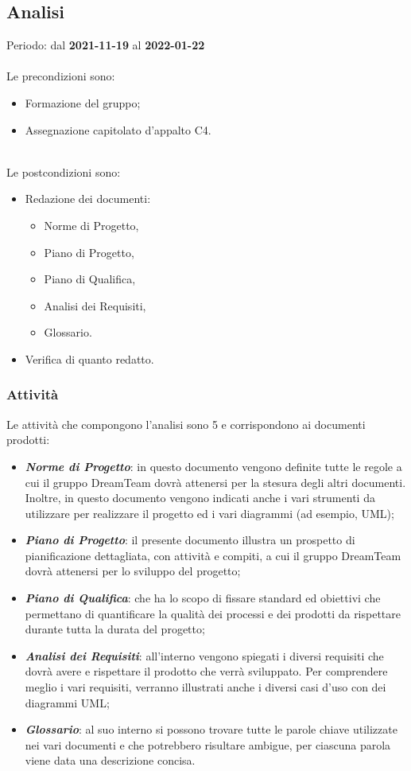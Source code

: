 
\subsection{Analisi} 
Periodo: dal \textbf{2021-11-19} al \textbf{2022-01-22}  \mbox{} \\ \mbox{} \\
Le precondizioni sono:
\begin{itemize}
\item Formazione del gruppo;
\item Assegnazione capitolato\glo{} d’appalto C4.
\end{itemize}  \mbox{} \\
Le postcondizioni sono:
\begin{itemize}
\item Redazione dei documenti:
\begin{itemize}
	\item Norme di Progetto,
	\item Piano di Progetto,
	\item Piano di Qualifica,
	\item Analisi dei Requisiti,
	\item Glossario.
\end{itemize}
\item Verifica di quanto redatto.
\end{itemize}

\subsubsection{Attività}

Le attività che compongono l’analisi sono 5 e corrispondono ai documenti prodotti:

\begin{itemize}
\item \textbf{\textit{Norme di Progetto}}: in questo documento vengono definite tutte le regole a cui il gruppo DreamTeam dovrà attenersi per la stesura degli altri documenti. Inoltre, in questo documento vengono indicati anche i vari strumenti da utilizzare per realizzare il progetto ed i vari diagrammi (ad esempio, UML\glo{});  
\item \textbf{\textit{Piano di Progetto}}: il presente documento illustra un prospetto di pianificazione dettagliata, con attività e compiti, a cui il gruppo DreamTeam dovrà attenersi per lo sviluppo del progetto;
\item \textbf{\textit{Piano di Qualifica}}: che ha lo scopo di fissare standard ed obiettivi che permettano di quantificare la qualità dei processi e dei prodotti da rispettare durante tutta la durata del progetto;
\item \textbf{\textit{Analisi dei Requisiti}}: all’interno vengono spiegati i diversi requisiti che dovrà avere e rispettare il prodotto che verrà sviluppato. Per comprendere meglio i vari requisiti, verranno illustrati anche i diversi casi d’uso con dei diagrammi UML;
\item \textbf{\textit{Glossario}}: al suo interno si possono trovare tutte le parole chiave utilizzate nei vari documenti e che potrebbero risultare ambigue, per ciascuna parola viene data una descrizione concisa.
\end{itemize}

